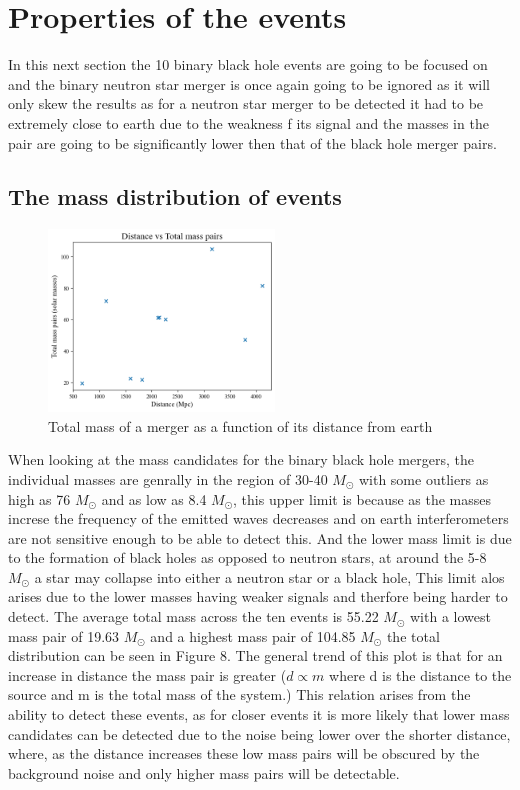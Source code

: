 \documentclass[]{article}
\begin{document}
\section*{Properties of the events}
In this next section the 10 binary black hole events are going to be focused on and the binary
neutron star merger is once again going to be ignored as
it will only skew the results as for a neutron star merger to be detected it had to be extremely
close to earth due to the weakness f its signal and the masses in the pair are going to be
significantly lower then that of the black hole merger pairs.
\subsection*{The mass distribution of events}
\begin{figure}
    \includegraphics[width=6cm]{images/mass_pairs.png}
    \caption{Total mass of a merger as a function of its distance from earth}
    \label{fig:mass_pairs}
\end{figure}

When looking at the mass candidates for the binary black hole mergers, the individual masses are genrally in the region of
30-40 $M_{\odot}$ with some outliers as high as 76 $M_{\odot}$ and as low as 8.4 $M_{\odot}$, this upper limit is because as the masses increse the frequency of the emitted waves
decreases and on earth interferometers are not sensitive enough to be able to detect this. And the lower mass limit is due to the
formation of black holes as opposed to neutron stars, at around the 5-8 $M_{\odot}$ a star may collapse into either a neutron star or a black hole,
This limit alos arises due to the lower masses having weaker signals and therfore being harder to detect. The average total mass across
the ten events is 55.22 $M_{\odot}$ with a lowest mass pair of 19.63 $M_{\odot}$ and a highest
mass pair of 104.85 $M_{\odot} $ the total distribution can be seen in Figure 8.
The general trend of this plot is that for an increase in distance the mass pair is greater ($d \propto m $ where d is the distance to the source and m is the total mass of the system.)
This relation arises from the ability to detect these events, as for closer events it is more likely that lower mass candidates can be
detected due to the noise being lower over the shorter distance, where, as the distance increases these low mass pairs will be obscured by the background noise and only higher
mass pairs will be detectable.
\end{document}
